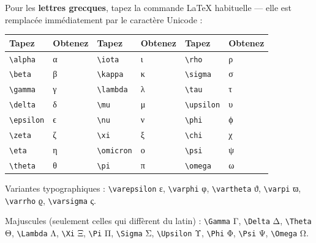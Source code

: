 \documentclass[11pt,a4paper]{article}
\theoremstyle{definition}
\begin{document}
Pour les \textbf{lettres grecques}, tapez la commande LaTeX habituelle —
elle est remplacée immédiatement par le caractère Unicode :


\begin{tabularx}{\textwidth}{>{\raggedright\arraybackslash}X>{\raggedright\arraybackslash}X>{\raggedright\arraybackslash}X>{\raggedright\arraybackslash}X>{\raggedright\arraybackslash}X>{\raggedright\arraybackslash}X}
  \toprule
  Tapez & Obtenez & Tapez & Obtenez & Tapez & Obtenez \\
  \midrule
  \texttt{\textbackslash{}alpha} & α & \texttt{\textbackslash{}iota} & ι & \texttt{\textbackslash{}rho} & ρ \\
  \texttt{\textbackslash{}beta} & β & \texttt{\textbackslash{}kappa} & κ & \texttt{\textbackslash{}sigma} & σ \\
  \texttt{\textbackslash{}gamma} & γ & \texttt{\textbackslash{}lambda} & λ & \texttt{\textbackslash{}tau} & τ \\
  \texttt{\textbackslash{}delta} & δ & \texttt{\textbackslash{}mu} & μ & \texttt{\textbackslash{}upsilon} & υ \\
  \texttt{\textbackslash{}epsilon} & ϵ & \texttt{\textbackslash{}nu} & ν & \texttt{\textbackslash{}phi} & ϕ \\
  \texttt{\textbackslash{}zeta} & ζ & \texttt{\textbackslash{}xi} & ξ & \texttt{\textbackslash{}chi} & χ \\
  \texttt{\textbackslash{}eta} & η & \texttt{\textbackslash{}omicron} & ο & \texttt{\textbackslash{}psi} & ψ \\
  \texttt{\textbackslash{}theta} & θ & \texttt{\textbackslash{}pi} & π & \texttt{\textbackslash{}omega} & ω \\
  \bottomrule
\end{tabularx}

Variantes typographiques :
\texttt{\textbackslash{}varepsilon} ε, \texttt{\textbackslash{}varphi} φ, \texttt{\textbackslash{}vartheta} ϑ, \texttt{\textbackslash{}varpi} ϖ, \texttt{\textbackslash{}varrho} ϱ,
\texttt{\textbackslash{}varsigma} ς.


Majuscules (seulement celles qui diffèrent du latin) :
\texttt{\textbackslash{}Gamma} Γ, \texttt{\textbackslash{}Delta} Δ, \texttt{\textbackslash{}Theta} Θ, \texttt{\textbackslash{}Lambda} Λ, \texttt{\textbackslash{}Xi} Ξ, \texttt{\textbackslash{}Pi} Π,
\texttt{\textbackslash{}Sigma} Σ, \texttt{\textbackslash{}Upsilon} Υ, \texttt{\textbackslash{}Phi} Φ, \texttt{\textbackslash{}Psi} Ψ, \texttt{\textbackslash{}Omega} Ω.
\end{document}
